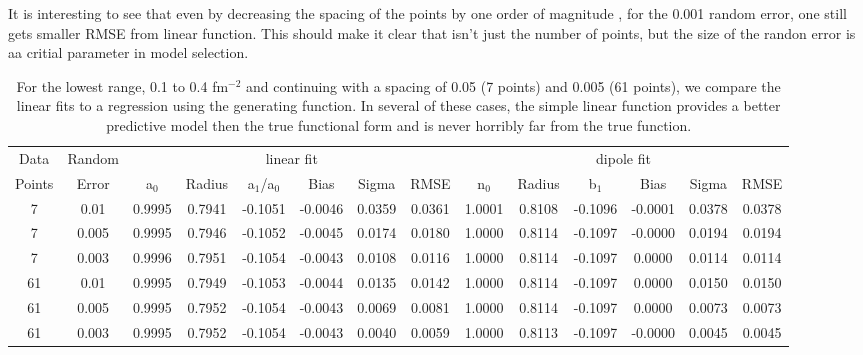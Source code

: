 \documentclass[10pt,aps,prc,twocolumn]{revtex4-1}
\begin{document}
It is interesting to see that even by decreasing the spacing of the points
by one order of magnitude , for the 0.001 random error,
one still gets smaller RMSE from linear function.   This should make it clear that isn't just the number of
points, but the size of the randon error is aa critial parameter in model selection.

\begin{table}
\caption{For the lowest range, 0.1 to 0.4 fm$^{-2}$ and continuing with a spacing of 0.05 (7 points) and 0.005 (61 points),
we compare the linear fits to a regression using the generating function.   In several of these cases, the simple linear 
function provides a better predictive model then the true functional form and is never horribly far from the true function.}
\begin{tabular}{cc|cccccc|cccccc} \hline
Data   & Random   & \multicolumn{6}{c|}{linear fit}                       & \multicolumn{6}{c}{dipole fit}            \\ 
Points & Error    & a$_0$ & Radius&a$_1$/a$_0$&  Bias  & Sigma &  RMSE  & n$_0$ & Radius& b$_1$  &  Bias  & Sigma &  RMSE   \\  \hline
7      & 0.01     & 0.9995& 0.7941& -0.1051& -0.0046& 0.0359& 0.0361 & 1.0001& 0.8108& -0.1096& -0.0001& 0.0378& 0.0378  \\ 
7      & 0.005    & 0.9995& 0.7946& -0.1052& -0.0045& 0.0174& 0.0180 & 1.0000& 0.8114& -0.1097& -0.0000& 0.0194& 0.0194  \\
7      & 0.003    & 0.9996& 0.7951& -0.1054& -0.0043& 0.0108& 0.0116 & 1.0000& 0.8114& -0.1097&  0.0000& 0.0114& 0.0114  \\
61     & 0.01     & 0.9995& 0.7949& -0.1053& -0.0044& 0.0135& 0.0142 & 1.0000& 0.8114& -0.1097&  0.0000& 0.0150& 0.0150  \\ 
61     & 0.005    & 0.9995& 0.7952& -0.1054& -0.0043& 0.0069& 0.0081 & 1.0000& 0.8114& -0.1097&  0.0000& 0.0073& 0.0073  \\ 
61     & 0.003    & 0.9995& 0.7952& -0.1054& -0.0043& 0.0040& 0.0059 & 1.0000& 0.8113& -0.1097& -0.0000& 0.0045& 0.0045  \\ \hline 
\end{tabular}
\label{simpleVSperfect}
\end{table}
\end{document}
